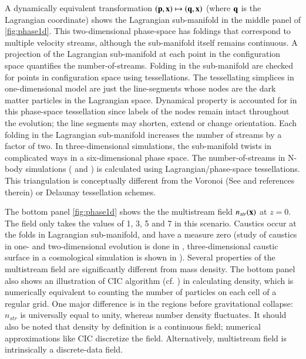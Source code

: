  
A dynamically equivalent transformation $(\bf{p}, \bf{x}) \mapsto (\bf{q}, \bf{x}) $ (where $\bf{q}$ is the Lagrangian coordinate) shows the Lagrangian sub-manifold in the middle panel of \autoref{fig:phase1d}. This two-dimensional phase-space has foldings that correspond to multiple velocity streams, although the sub-manifold itself remains continuous. A projection of the Lagrangian sub-manifold at each point in the configuration space quantifies the number-of-streams. Folding in the sub-manifold are checked for points in configuration space using tessellations. The tessellating simplices in one-dimensional model are just the line-segments whose nodes are the dark matter particles in the Lagrangian space. Dynamical property is accounted for in this phase-space tessellation since labels of the nodes remain intact throughout the evolution; the line segments may shorten, extend or change orientation. Each folding in the Lagrangian sub-manifold increases the number of streams by a factor of two. In three-dimensional simulations, the sub-manifold twists in complicated ways in a six-dimensional phase space. The number-of-streams in N-body simulations (\citealt{Shandarin2012} and \citealt{Abel2012}) is calculated using Lagrangian/phase-space tessellations. This triangulation is conceptually different from the Voronoi (See \citealt{Schaap2000} and references therein) or Delaunay \citep{Icke1991} tessellation schemes. 

The bottom panel \autoref{fig:phase1d} shows the the multistream field $n_{str}(\bf{x})$ at $z = 0$. The field only takes the values of 1, 3, 5 and 7 in this scenario. Caustics occur at the folds in Lagrangian sub-manifold, and have a measure zero (study of caustics in one- and  two-dimensional evolution is done in \cite{Hidding2014}, three-dimensional caustic surface in a cosmological simulation is shown in \cite{Ramachandra2017} ). Several properties of the multistream field are significantly different from mass density. The bottom panel also shows an illustration of CIC algorithm (cf. \citealt{Hockney1988}) in calculating density, which is numerically equivalent to counting the number of particles on each cell of a regular grid. One major difference is in the regions before gravitational collapse: $n_{str}$ is universally equal to unity, whereas number density fluctuates. It should also be noted that density by definition is a continuous field; numerical approximations like CIC discretize the field. Alternatively, multistream field is intrinsically a discrete-data field.  



